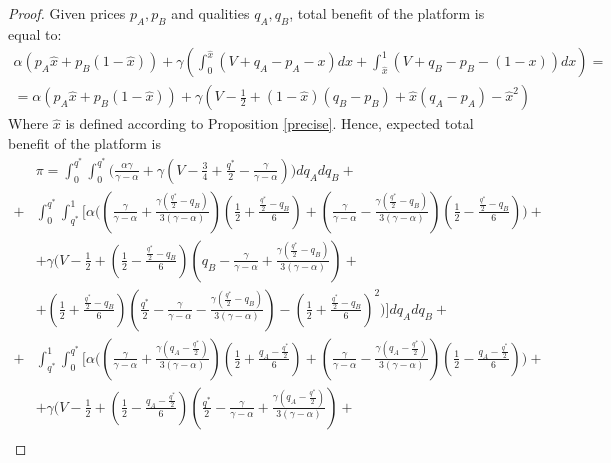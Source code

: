 \documentclass[a4paper]{article}
\begin{document}
	\begin{proof} Given prices $p_A, p_B$ and qualities $q_A, q_B$, total benefit of the platform is equal to:
		\begin{align*}
		\alpha(p_A \hat{x} + p_B(1-\hat{x})) + \gamma \left(\int_{0}^{\hat{x}} (V + q_A - p_A - x)dx + \int_{\hat{x}}^1 (V + q_B - p_B -(1-x))dx\right) = \\
		= 	\alpha(p_A \hat{x} + p_B(1-\hat{x})) + \gamma \left(V - \frac{1}{2}+(1-\hat{x})(q_B - p_B) + \hat{x}(q_A-p_A) - \hat{x}^2  \right)
		\end{align*}
		Where $\hat{x}$ is defined according to Proposition \ref{precise}. Hence, expected total benefit of the platform is
		\begin{align*}
		&\pi = \int_{0}^{q^*} \int_0^{q^*} \biggl( \frac{\alpha \gamma}{\gamma - \alpha} + \gamma \left(V - \frac{3}{4}+ \frac{q^*}{2} - \frac{\gamma}{\gamma - \alpha} \right)\biggr) dq_A dq_B +\\+
		&\int_0^{q^*} \int_{q^*}^1 \biggl[ \alpha \biggl( \left( \frac{\gamma}{\gamma - \alpha} + \frac{\gamma\left( \frac{q^*}{2} - q_B \right) }{3(\gamma - \alpha)} \right)\left(\frac{1}{2} + \frac{\frac{q^*}{2} - q_B}{6} \right) + \left( \frac{\gamma}{\gamma - \alpha} - \frac{\gamma\left( \frac{q^*}{2} - q_B \right) }{3(\gamma - \alpha)} \right)\left(\frac{1}{2} - \frac{\frac{q^*}{2} - q_B}{6} \right) \biggr)+\\
		&+\gamma \biggl(V - \frac{1}{2} + \left(\frac{1}{2} - \frac{\frac{q^*}{2} - q_B}{6} \right) \left( q_B - \frac{\gamma}{\gamma - \alpha} + \frac{\gamma \left( \frac{q^*}{2} - q_B \right)}{3 (\gamma - \alpha)} \right)  + \\
		&+ \left(\frac{1}{2} + \frac{\frac{q^*}{2} - q_B}{6} \right) \left(\frac{q^*}{2} - \frac{\gamma}{\gamma - \alpha} - \frac{\gamma \left( \frac{q^*}{2} - q_B \right)}{3(\gamma - \alpha)} \right)  - \left( \frac{1}{2} + \frac{\frac{q^*}{2} - q_B}{6} \right)^2 \biggr)  \biggr] dq_A dq_B +\\
		+
		&\int_{q^*}^{1} \int_{0}^{q^*} \biggl[ \alpha \biggl( \left( \frac{\gamma}{\gamma - \alpha} + \frac{\gamma\left(q_A - \frac{q^*}{2} \right) }{3(\gamma - \alpha)} \right)\left(\frac{1}{2} + \frac{q_A - \frac{q^*}{2}}{6} \right) + \left( \frac{\gamma}{\gamma - \alpha} - \frac{\gamma\left(q_A- \frac{q^*}{2} \right) }{3(\gamma - \alpha)} \right)\left(\frac{1}{2} - \frac{q_A -\frac{q^*}{2}}{6} \right) \biggr)+\\
		&+\gamma \biggl(V - \frac{1}{2} + \left(\frac{1}{2} - \frac{q_A-\frac{q^*}{2}}{6} \right) \left( \frac{q^*}{2} - \frac{\gamma}{\gamma - \alpha} + \frac{\gamma \left(q_A -  \frac{q^*}{2} \right)}{3 (\gamma - \alpha)} \right)  + \\

\end{align*}
\end{proof}
\end{document}
